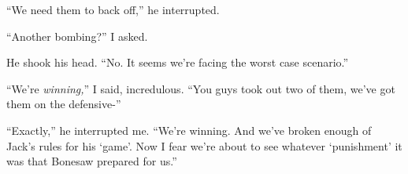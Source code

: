 ``We need them to back off,'' he interrupted.



``Another bombing?''  I asked.



He shook his head.  ``No.  It seems we're facing the worst case scenario.''



``We're \emph{winning,}'' I said, incredulous.  ``You guys took out two of them, we've got them on the defensive-''



``Exactly,'' he interrupted me.  ``We're winning.  And we've broken enough of Jack's rules for his `game'.  Now I fear we're about to see whatever `punishment' it was that Bonesaw prepared for us.''





